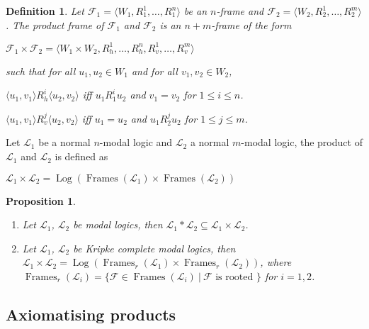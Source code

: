 \documentclass[a4paper]{article}
\theoremstyle{defin}
\newtheorem{defin}{Definition}
\theoremstyle{theorem}
\theoremstyle{prop}
\newtheorem{prop}{Proposition}
\theoremstyle{lemma}
\theoremstyle{ex}
\theoremstyle{col}
\begin{document}
\begin{defin} Let $\mathcal{F}_1 = \langle W_1, R_1^1, \dots, R_1^n\rangle$ be an $n$-frame and $\mathcal{F}_2 = \langle W_2, R_2^1, \dots, R_2^m\rangle$.
The product frame of $\mathcal{F}_1$ and $\mathcal{F}_2$ is an $n+m$-frame of the form
\begin{center}
$\mathcal{F}_1 \times \mathcal{F}_2 = \langle W_1 \times W_2, R_h^1, \dots, R_h^n, R_v^1, \dots, R_v^m \rangle$
\end{center}
such that for all $u_1, u_2 \in W_1$ and for all $v_1, v_2 \in W_2$,
\begin{center}
  $\langle u_1, v_1 \rangle R^i_h \langle u_2, v_2 \rangle$ iff $u_1 R_1^i u_2$ and $v_1 = v_2$ for
  $1 \leq i \leq n$.

  $\langle u_1, v_1 \rangle R^j_v \langle u_2, v_2 \rangle$ iff $u_1 = u_2$ and $u_1 R_2^j u_2$ for $1 \leq j \leq m$.
\end{center}
\end{defin}

Let $\mathcal{L}_1$ be a normal $n$-modal logic and $\mathcal{L}_2$ a normal $m$-modal logic, the product of $\mathcal{L}_1$ and $\mathcal{L}_2$ is defined as

\begin{center}
  $\mathcal{L}_1 \times \mathcal{L}_2 = \operatorname{Log}(\operatorname{Frames}(\mathcal{L}_1 ) \times \operatorname{Frames}(\mathcal{L}_2))$
\end{center}

\begin{prop}
  $ $

  \begin{enumerate}
    \item Let $\mathcal{L}_1$, $\mathcal{L}_2$ be modal logics, then $\mathcal{L}_1 * \mathcal{L}_2 \subseteq \mathcal{L}_1 \times \mathcal{L}_2$.
    \item Let $\mathcal{L}_1$, $\mathcal{L}_2$ be Kripke complete modal logics, then $\mathcal{L}_1 \times \mathcal{L}_2 = \operatorname{Log}(\operatorname{Frames}_r(\mathcal{L}_1) \times \operatorname{Frames}_r(\mathcal{L}_2))$, where $\operatorname{Frames}_r(\mathcal{L}_i) = \{\mathcal{F} \in \operatorname{Frames}(\mathcal{L}_i) \: | \: \mathcal{F} \text{ is rooted }\}$ for $i = 1,2$.
  \end{enumerate}
\end{prop}

\subsection{Axiomatising products}
\end{document}
